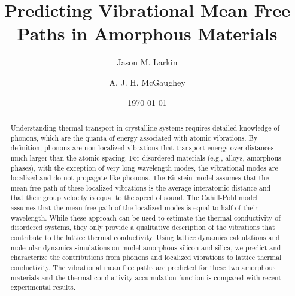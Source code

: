 \documentclass[aps,prb,twocolumn,superscriptaddress,footinbib,amsmath,amssymb,floatfix]{revtex4}
\begin{document}
\title{Predicting Vibrational Mean Free Paths in Amorphous Materials}
\author{Jason M. Larkin}
\author{A. J. H. McGaughey}
\date{\today}
\begin{abstract}
Understanding thermal transport in crystalline systems requires detailed 
knowledge of phonons, which are the quanta of energy associated with atomic 
vibrations. By definition, phonons are non-localized vibrations that 
transport energy over distances much larger than the atomic spacing. For 
disordered materials (e.g., alloys, amorphous phases), with the exception 
of very long wavelength modes, the vibrational modes are localized and do 
not propagate like phonons. The Einstein model assumes that the mean free 
path of these localized vibrations is the average interatomic distance and 
that their group velocity is equal to the speed of sound. The Cahill-Pohl 
model assumes that the mean free path of the localized modes is equal to 
half of their wavelength. While these approach can be used to estimate the 
thermal conductivity of disordered systems, they only 
provide a qualitative description of the vibrations that contribute to the 
lattice thermal conductivity.
Using lattice dynamics calculations and molecular dynamics simulations on 
model amorphous silicon and silica, we predict and 
characterize the contributions from phonons and localized vibrations to 
lattice thermal conductivity. The vibrational mean free paths are 
predicted for these two amorphous materials and the thermal 
conductivity accumulation function is compared with recent experimental 
results.

\end{abstract}
\maketitle
\clearpage
\end{document}
